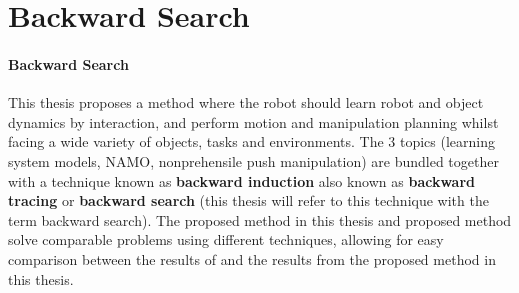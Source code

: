 
\section{Backward Search}%
\label{sec:backward_search}


\paragraph{Backward Search}
This thesis proposes a method where the robot should learn robot and object dynamics by interaction, and perform motion and manipulation planning whilst facing a wide variety of objects, tasks and environments. The 3 topics (learning system models, \ac{NAMO}, nonprehensile push manipulation) are bundled together with a technique known as \textbf{backward induction} also known as \textbf{backward tracing} or \textbf{backward search} (this thesis will refer to this technique with the term backward search). The proposed method in this thesis and \citeauthor{sabbaghnovin_model_2021} proposed method solve comparable problems using different techniques, allowing for easy comparison between the results of \citeauthor{sabbaghnovin_model_2021} and the results from the proposed method in this thesis.\bs
{}

\cite{krontiris_dealing_2015}





